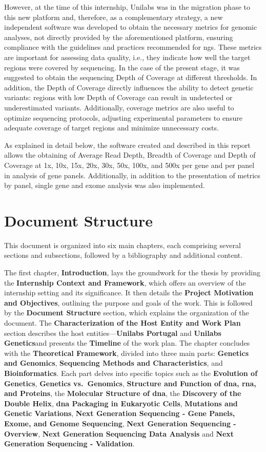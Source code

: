 However, at the time of this internship, Unilabs was in the migration phase to this new platform and, therefore, as a complementary strategy, a new independent software was developed to obtain the necessary metrics for genomic analyses, not directly provided by the aforementioned platform, ensuring compliance with the guidelines and practices recommended for \ac{ngs}. These metrics are important for assessing data quality, i.e., they indicate how well the target regions were covered by sequencing. In the case of the present stage, it was suggested to obtain the sequencing Depth of Coverage at different thresholds. In addition, the Depth of Coverage directly influences the ability to detect genetic variants: regions with low Depth of Coverage can result in undetected or underestimated variants. Additionally, coverage metrics are also useful to optimize sequencing protocols, adjusting experimental parameters to ensure adequate coverage of target regions and minimize unnecessary costs. 

As explained in detail below, the software created and described in this report allows the obtaining of Average Read Depth, Breadth of Coverage and Depth of Coverage at 1x, 10x, 15x, 20x, 30x, 50x, 100x, and 500x per gene and per panel in analysis of gene panels. Additionally, in addition to the presentation of metrics by panel, single gene and exome analysis was also implemented.

\section{Document Structure} \label{sec:doc_structure}

This document is organized into six main chapters, each comprising several sections and subsections, followed by a bibliography and additional content.

The first chapter, \textbf{Introduction}, lays the groundwork for the thesis by providing the \textbf{Internship Context and Framework}, which offers an overview of the internship setting and its significance. It then details the \textbf{Project Motivation and Objectives}, outlining the purpose and goals of the work. This is followed by the \textbf{Document Structure} section, which explains the organization of the document. The \textbf{Characterization of the Host Entity and Work Plan} section describes the host entities—\textbf{Unilabs Portugal} and \textbf{Unilabs Genetics}and presents the \textbf{Timeline} of the work plan. The chapter concludes with the \textbf{Theoretical Framework}, divided into three main parts: \textbf{Genetics and Genomics}, \textbf{Sequencing Methods and Characteristics}, and \textbf{Bioinformatics}. Each part delves into specific topics such as the \textbf{Evolution of Genetics}, \textbf{Genetics vs.\ Genomics}, \textbf{Structure and Function of \ac{dna}, \ac{rna}, and Proteins}, the \textbf{Molecular Structure of \ac{dna}}, the \textbf{Discovery of the Double Helix}, \textbf{\ac{dna} Packaging in Eukaryotic Cells}, \textbf{Mutations and Genetic Variations}, \textbf{Next Generation Sequencing - Gene Panels, Exome, and Genome Sequencing}, \textbf{Next Generation Sequencing - Overview}, \textbf{Next Generation Sequencing Data Analysis} and \textbf{Next Generation Sequencing - Validation}.

